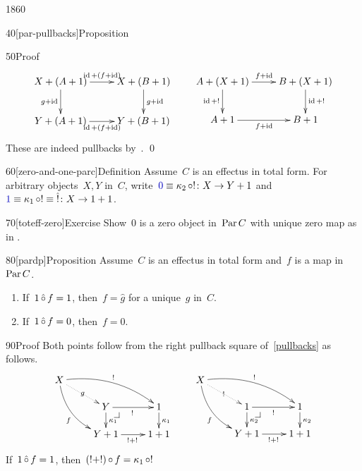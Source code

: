 \begin{parsec}{1860}
\begin{point}{40}[par-pullbacks]{Proposition}
\begin{point}{50}{Proof}
\begin{equation*}
    \xymatrix{
        X+(A+1) \ar[r]^{\id + (f+\id)} \ar[d]_{g+ \id}
        & X+(B+1) \ar[d]^{g+\id}
        \\ Y+(A+1) \ar[r]_{\id+(f +\id)}
        & Y+(B+1)
    } \qquad
    \xymatrix{
        A+(X+1) \ar[r]^{f+\id} \ar[d]_{\id+!}
        & B+(X+1)  \ar[d]^{\id+!}
        \\ A+1 \ar[r]_{f+\id}
        & B+1
    }
\end{equation*}
These are indeed pullbacks by~. \qed
\end{point}
\end{point}
\begin{point}{60}[zero-and-one-parc]{Definition}%
Assume~$C$ is an effectus in total form.
For arbitrary objects~$X,Y$ in~$C$,
    write~$\Define{0} \equiv \kappa_2 \after !\colon X \to Y+1$
    and~$\Define{1} \equiv \kappa_1 \after ! \equiv \hat! \colon X \to 1+1$.
\end{point}
\begin{point}{70}[toteff-zero]{Exercise}%
    Show~$0$ is a zero object in~$\operatorname{Par} C$
        with unique zero map
        as in .
\end{point}
\begin{point}{80}[pardp]{Proposition}%
Assume~$C$ is an effectus in total form
    and~$f$ is a map in~$\operatorname{Par} C$.
\begin{enumerate}
\item
If~$1 \mathop{\hat\circ} f = 1$,
    then~$f = \hat{g}$ for a unique~$g$ in~$C$.
\item
If~$1 \mathop{\hat\circ} f = 0$, then~$f = 0$.
\end{enumerate}
\begin{point}{90}{Proof}%
Both points follow from the right pullback square of~\eqref{pullbacks}
 as follows.
\begin{equation*}
    \xymatrix@R-.8pc{
    X \ar@{.>}[rd]|g
    \ar@/^1pc/[rrd]^{!}
        \ar@/_1pc/[rdd]_f
        \\& Y \pullback
        \ar[r]_{!}
        \ar[d]^{\kappa_1}
    & 1
        \ar[d]^{\kappa_1}
    \\& Y+1
        \ar[r]_{!+!}
&1+1
}
\qquad
    \xymatrix@R-.8pc{
        X \ar@{.>}[rd]|{!}
    \ar@/^1pc/[rrd]^{!}
        \ar@/_1pc/[rdd]_f
        \\& 1 \pullback
        \ar[r]_{!}
        \ar[d]^{\kappa_2}
    & 1
        \ar[d]^{\kappa_2}
    \\& Y+1
        \ar[r]_{!+!}
&1+1
}
\end{equation*}
If~$1 \mathop{\hat\circ} f = 1$, then~$(!+!)\mathop{\circ} f = \kappa_1 \mathop{\circ} !$

\end{point}
\end{point}
\end{parsec}
